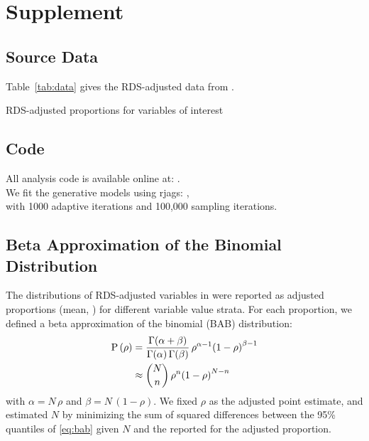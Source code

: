 \section{Supplement}
\subsection{Source Data}\label{app.data}
Table~\ref{tab:data} gives the RDS-adjusted data from \cite{Baral2014}.
\begin{table}[h]
  \centering
  \caption{RDS-adjusted proportions for variables of interest}
  \label{tab:data}
  
\end{table}
\subsection{Code}\label{app.code}
All analysis code is available online at: .\\
We fit the generative models using rjags: ,\\
with 1000 adaptive iterations and 100,000 sampling iterations.
\subsection{Beta Approximation of the Binomial Distribution}\label{app.bab}
The distributions of RDS-adjusted variables in \cite{Baral2014} were reported as
adjusted proportions (mean, \ci) for different variable value strata.
For each proportion, we defined a beta approximation of the binomial (BAB) distribution:
\begin{align}\label{eq:bab}
  \mathrm{P}\,(\rho) &=
    \frac{\Gamma(\alpha+\beta)}{\Gamma(\alpha)\,\Gamma(\beta)}\,
    \rho^{\alpha-1}{(1 - \rho)}^{\beta-1} \\
    &\approx {N \choose n} \, \rho^{n}{(1 - \rho)}^{N - n} \nonumber
\end{align}
with $\alpha = N\,\rho$ and $\beta = N\,(1-\rho)$.
We fixed $\rho$ as the adjusted point estimate,
and estimated $N$ by minimizing the sum of squared differences between
the 95\% quantiles of \eqref{eq:bab} given $N$ and the reported \ci for the adjusted proportion.
